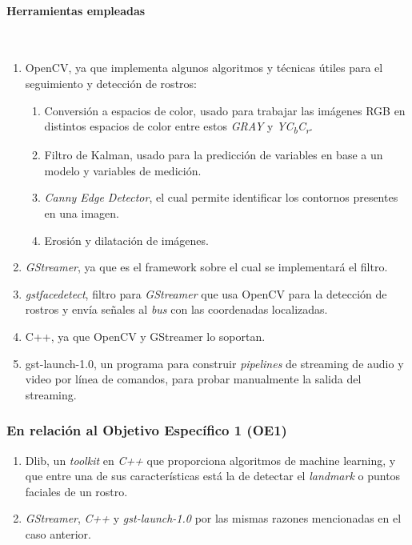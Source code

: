 \documentclass[a4paper,openright,12pt]{report}
\begin{document}
\paragraph{Herramientas empleadas}\mbox{} \\
\begin{enumerate}
    \item OpenCV, ya que implementa algunos algoritmos y técnicas
        útiles para el seguimiento y detección de rostros:
    \begin{enumerate}
        \item Conversión a espacios de color, usado para trabajar las imágenes
            RGB en distintos espacios de color entre estos \textit{GRAY} y
            \textit{YC\textsubscript{b}C\textsubscript{r}}.
        \item Filtro de Kalman, usado para la predicción de variables en base
            a un modelo y variables de medición.
        \item \textit{Canny Edge Detector}, el cual permite identificar los
            contornos presentes en una imagen.
        \item Erosión y dilatación de imágenes.
    \end{enumerate}
    \item \textit{GStreamer}, ya que es el framework sobre el cual se
        implementará el filtro.
    \item \textit{gstfacedetect}, filtro para \textit{GStreamer} que usa OpenCV
        para la detección de rostros y envía señales al \textit{bus} con las
        coordenadas localizadas.
    \item C++, ya que OpenCV y GStreamer lo soportan.
    \item gst-launch-1.0, un programa para construir \textit{pipelines} de
    streaming de audio y video por línea de comandos, para probar manualmente
    la salida del streaming.
\end{enumerate}

\subsubsection{En relación al Objetivo Específico 1 (OE1)}
\begin{enumerate}
    \item Dlib, un \textit{toolkit} en \textit{C++} que proporciona algoritmos
    de machine learning, y que entre una de sus características está la de
    detectar el \textit{landmark} o puntos faciales de un rostro.
    \item \textit{GStreamer}, \textit{C++} y \textit{gst-launch-1.0}
        por las mismas razones mencionadas en el caso anterior.
\end{enumerate}
\end{document}
